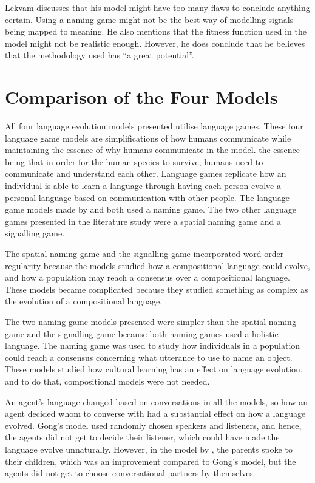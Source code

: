 Lekvam discusses that his model might have too many flaws to conclude anything certain. Using a naming game might not be the best way of modelling signals being mapped to meaning. He also mentions that the fitness function used in the model might not be realistic enough. However, he does conclude that he believes that the methodology used has ``a great potential''.


\section{Comparison of the Four Models}
All four language evolution models presented utilise language games. These four language game models are simplifications of how humans communicate while maintaining the essence of why humans communicate in the model. the essence being that in order for the human species to survive, humans need to communicate and understand each other. Language games replicate how an individual is able to learn a language through having each person evolve a personal language based on communication with other people. The language game models made by \citet{lipowska2011naming} and \citet{lekvam2014co} both used a naming game. The two other language games presented in the literature study were a spatial naming game and a signalling game. 

The spatial naming game and the signalling game incorporated word order regularity because the models studied how a compositional language could evolve, and how a population may reach a consensus over a compositional language. These models became complicated because they studied something as complex as the evolution of a compositional language. 

The two naming game models presented were simpler than the spatial naming game and the signalling game because both naming games used a holistic language. The naming game was used to study how individuals in a population could reach a consensus concerning what utterance to use to name an object. These models studied how cultural learning has an effect on language evolution, and to do that, compositional models were not needed. 

An agent’s language changed based on conversations in all the models, so how an agent decided whom to converse with had a substantial effect on how a language evolved. Gong’s model \citep{gong2011simulating} used randomly chosen speakers and listeners, and hence, the agents did not get to decide their listener, which could have made the language evolve unnaturally. However, in the model by \citet{munroe2002learning}, the parents spoke to their children, which was an improvement compared to Gong’s model, but the agents did not get to choose conversational partners by themselves.

